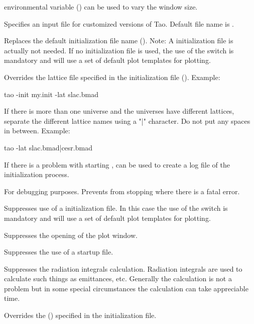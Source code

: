 \begin{description}
{{environmental variable  () can be used to vary the
window size.
%
\item[-hook_init_file] \Newline
Specifies an input file for customized versions of Tao. Default file
name is .
%
\item[-init_file <file_name>] \Newline
Replaces the default \tao initialization file name (). Note: A \tao initialization file
is actually not needed. If no \tao initialization file is used, the use of the 
switch is mandatory and \tao will use a set of default plot templates for plotting.
%
\item[-lattice_file <file_name>] \Newline
Overrides the  lattice file specified in the \tao initialization file
(). Example:
\begin{example}
  tao -init my.init -lat slac.bmad
\end{example}
If there is more than one universe and the universes have different lattices, separate the different
lattice names using a "|" character.  Do not put any spaces in between. Example:
\begin{example}
  tao -lat slac.bmad|cesr.bmad
\end{example}
%
\item[-log_startup]
If there is a problem with starting \tao,  can be used to create a log file of the
initialization process.
%
\item[-no_stopping] \Newline
For debugging purposes. Prevents \tao from stopping where there is a fatal error.
%
\item[-noinit] \Newline
Suppresses use of a \tao initialization file. In this case the use of the  switch
is mandatory and \tao will use a set of default plot templates for plotting.
%
\item[-noplot] \Newline
Suppresses the opening of the plot window.
%
\item[-nostartup] \Newline
Suppresses the use of a startup file.
%
\item[-no_rad_int] \Newline
Suppresses the radiation integrals calculation. Radiation integrals are used to calculate such
things as emittances, etc. Generally the calculation is not a problem but in some special
circumstances the calculation can take appreciable time.
%
\item[-plot_file <file_name>] \Newline
Overrides the  () specified in the \tao initialization file.
}}
\end{description}
